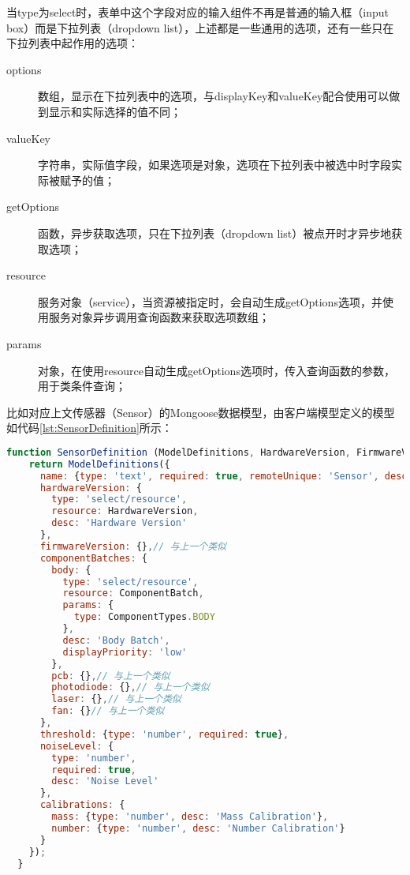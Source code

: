 当type为select时，表单中这个字段对应的输入组件不再是普通的输入框（input box）而是下拉列表（dropdown list），上述都是一些通用的选项，还有一些只在下拉列表中起作用的选项：
\begin{description}
  \item[options] 数组，显示在下拉列表中的选项，与displayKey和valueKey配合使用可以做到显示和实际选择的值不同；
  \item[valueKey] 字符串，实际值字段，如果选项是对象，选项在下拉列表中被选中时字段实际被赋予的值；
  \item[getOptions] 函数，异步获取选项，只在下拉列表（dropdown list）被点开时才异步地获取选项；
  \item[resource] 服务对象（service），当资源被指定时，会自动生成getOptions选项，并使用服务对象异步调用查询函数来获取选项数组；
  \item[params] 对象，在使用resource自动生成getOptions选项时，传入查询函数的参数，用于类条件查询；
\end{description}

比如对应上文传感器（Sensor）的Mongoose数据模型，由客户端模型定义的模型如代码\ref{lst:SensorDefinition}所示：
\begin{lstlisting}[language={JavaScript}, label={lst:SensorDefinition}, caption={Sensor的客户端模型}]
function SensorDefinition (ModelDefinitions, HardwareVersion, FirmwareVersion, ComponentBatch, ComponentTypes) {
    return ModelDefinitions({
      name: {type: 'text', required: true, remoteUnique: 'Sensor', desc: 'ID'},
      hardwareVersion: {
        type: 'select/resource',
        resource: HardwareVersion,
        desc: 'Hardware Version'
      },
      firmwareVersion: {},// 与上一个类似
      componentBatches: {
        body: {
          type: 'select/resource',
          resource: ComponentBatch,
          params: {
            type: ComponentTypes.BODY
          },
          desc: 'Body Batch',
          displayPriority: 'low'
        },
        pcb: {},// 与上一个类似
        photodiode: {},// 与上一个类似
        laser: {},// 与上一个类似
        fan: {}// 与上一个类似
      },
      threshold: {type: 'number', required: true},
      noiseLevel: {
        type: 'number',
        required: true,
        desc: 'Noise Level'
      },
      calibrations: {
        mass: {type: 'number', desc: 'Mass Calibration'},
        number: {type: 'number', desc: 'Number Calibration'}
      }
    });
  }
\end{lstlisting}

